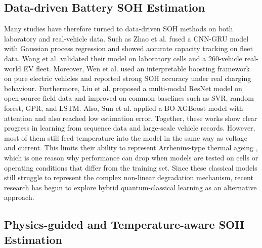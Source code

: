 \documentclass[a4paper,fleqn]{cas-sc}
\begin{document}
\subsection{Data-driven Battery SOH Estimation}\label{sec:rw-data}
Many studies have therefore turned to data-driven SOH methods on both laboratory and real-vehicle data. Such as Zhao et al. \citep{zhao2025capacity} fused a CNN-GRU model with Gaussian process regression and showed accurate capacity tracking on fleet data. Wang et al. \citep{wang2026lithium} validated their model on laboratory cells and a 260-vehicle real-world EV fleet. Moreover, Wen et al. \citep{wen2024lithium} used an interpretable boosting framework on pure electric vehicles and reported strong SOH accuracy under real charging behaviour. Furthermore, Liu et al. \citep{liu2025multi} proposed a multi-modal ResNet model on open-source field data and improved on common baselines such as SVR, random forest, GPR, and LSTM. Also, Sun et al. \citep{sun2025battery} applied a BO-XGBoost model with attention and also reached low estimation error. Together, these works show clear progress in learning from sequence data and large-scale vehicle records. However, most of them still feed temperature into the model in the same way as voltage and current. This limits their ability to represent Arrhenius-type thermal ageing \citep{gao2023effect}, which is one reason why performance can drop when models are tested on cells or operating conditions that differ from the training set. Since these classical models still struggle to represent the complex non-linear degradation mechanism, recent research has begun to explore hybrid quantum-classical learning as an alternative approach.

\subsection{Physics-guided and Temperature-aware SOH Estimation}\label{sec:rw-physics}
\end{document}
